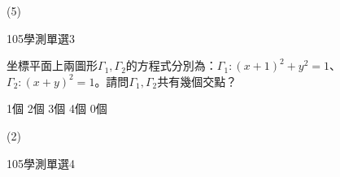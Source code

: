 \begin{QUESTIONS}
\begin{QUESTION}
        \begin{QTAGS}\end{QTAGS}
        \begin{QANS}
            (5)
        \end{QANS}
        \begin{QSOLLIST}
        \end{QSOLLIST}
        \begin{QEMPTYSPACE}
        \end{QEMPTYSPACE}
    \end{QUESTION}
    \begin{QUESTION}
        \begin{ExamInfo}{105}{學測}{單選}{3}
        \end{ExamInfo}
        \begin{ExamAnsRateInfo}{54}{77}{53}{32}
        \end{ExamAnsRateInfo}
        \begin{QBODY}
            坐標平面上兩圖形${{\Gamma }_{1}},{{\Gamma }_{2}}$的方程式分別為：${{\Gamma }_{1}}:{{(x+1)}^{2}}+{{y}^{2}}=1$、${{\Gamma }_{2}}:{{(x+y)}^{2}}=1$。請問${{\Gamma }_{1}},{{\Gamma }_{2}}$共有幾個交點？
			\begin{QOPS}
				\QOP 1個	
				\QOP 2個	
				\QOP 3個	
				\QOP 4個	
				\QOP 0個
			\end{QOPS}
        \end{QBODY}
        \begin{QFROMS}
        \end{QFROMS}
        \begin{QTAGS}\end{QTAGS}
        \begin{QANS}
            (2)
        \end{QANS}
        \begin{QSOLLIST}
        \end{QSOLLIST}
        \begin{QEMPTYSPACE}
        \end{QEMPTYSPACE}
    \end{QUESTION}
    \begin{QUESTION}
        \begin{ExamInfo}{105}{學測}{單選}{4}
        \end{ExamInfo}
        \begin{ExamAnsRateInfo}{54}{91}{55}{16}
        \end{ExamAnsRateInfo}

\end{QUESTION}
\end{QUESTIONS}
